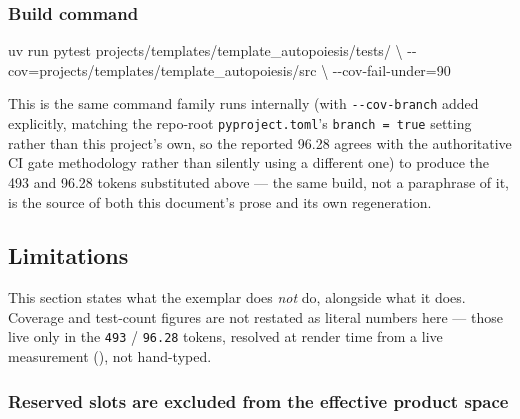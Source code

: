 \documentclass[
]{article}
\newenvironment{Shaded}{}{}
\newcommand{\AttributeTok}[1]{\textcolor[rgb]{0.49,0.56,0.16}{#1}}
\newcommand{\DataTypeTok}[1]{\textcolor[rgb]{0.56,0.13,0.00}{#1}}
\newcommand{\ExtensionTok}[1]{#1}
\newcommand{\NormalTok}[1]{#1}
\newcommand{\OperatorTok}[1]{\textcolor[rgb]{0.40,0.40,0.40}{#1}}
\begin{document}
\subsubsection{Build command}\label{build-command}

\begin{Shaded}
\begin{Highlighting}[]
\ExtensionTok{uv}\NormalTok{ run pytest projects/templates/template\_autopoiesis/tests/ }\DataTypeTok{\textbackslash{}}
  \AttributeTok{{-}{-}cov}\OperatorTok{=}\NormalTok{projects/templates/template\_autopoiesis/src }\DataTypeTok{\textbackslash{}}
  \AttributeTok{{-}{-}cov{-}fail{-}under}\OperatorTok{=}\NormalTok{90}
\end{Highlighting}
\end{Shaded}

This is the same command family  runs
internally (with \texttt{-\/-cov-branch} added explicitly, matching the
repo-root \texttt{pyproject.toml}'s \texttt{branch\ =\ true} setting
rather than this project's own, so the reported 96.28 agrees with the
authoritative CI gate methodology rather than silently using a different
one) to produce the 493 and 96.28 tokens substituted above --- the same
build, not a paraphrase of it, is the source of both this document's
prose and its own regeneration.

\newpage

\subsection{Limitations}\label{limitations}

This section states what the exemplar does \emph{not} do, alongside what
it does. Coverage and test-count figures are not restated as literal
numbers here --- those live only in the \texttt{493} / \texttt{96.28}
tokens, resolved at render time from a live measurement
(), not
hand-typed.

\subsubsection{Reserved slots are excluded from the effective product
space}\label{reserved-slots-are-excluded-from-the-effective-product-space}
\end{document}
